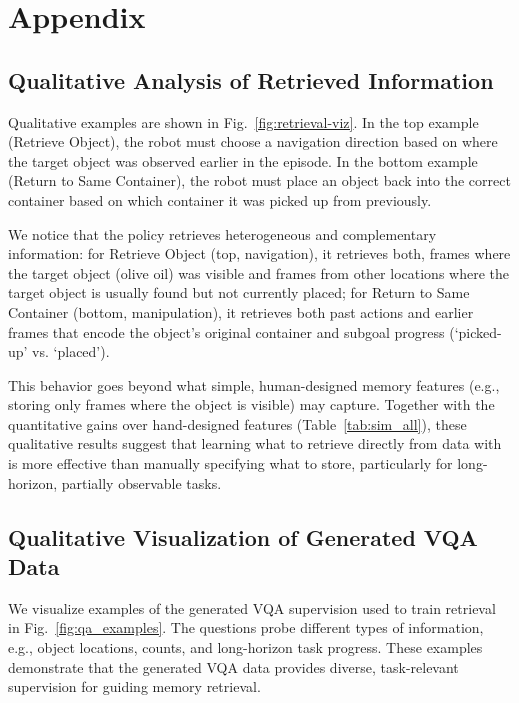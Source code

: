 \section{Appendix}

\subsection{Qualitative Analysis of Retrieved Information}\label{sec:app:retrieved_info_vis}
Qualitative examples are shown in Fig.~\ref{fig:retrieval-viz}. In the top example (Retrieve Object), the robot must choose a navigation direction based on where the target object was observed earlier in the episode. In the bottom example (Return to Same Container), the robot must place an object back into the correct container based on which container it was picked up from previously.

We notice that the policy retrieves heterogeneous and complementary information: for Retrieve Object (top, navigation), it retrieves both, frames where the target object (olive oil) was visible and frames from other locations where the target object is usually found but not currently placed; for Return to Same Container (bottom, manipulation), it retrieves both past actions and earlier frames that encode the object's original container and subgoal progress (`picked-up' vs. `placed').

This behavior goes beyond what simple, human-designed memory features (e.g., storing only frames where the object is visible) may capture. Together with the quantitative gains over hand-designed features  (Table~\ref{tab:sim_all}), these qualitative results suggest that learning what to retrieve directly from data with \ourmethod{} is more effective than manually specifying what to store, particularly for long-horizon, partially observable tasks.

\subsection{Qualitative Visualization of Generated VQA Data}\label{sec:app:vqa_viz}
We visualize examples of the generated VQA supervision used to train retrieval in Fig.~\ref{fig:qa_examples}. 
The questions probe different types of information, e.g., object locations, counts, and long-horizon task progress. 
These examples demonstrate that the generated VQA data provides diverse, task-relevant supervision for guiding memory retrieval. 
